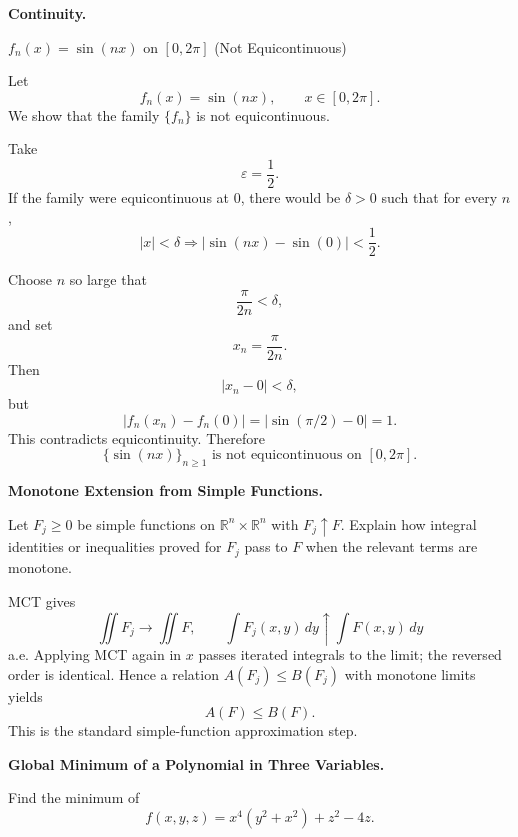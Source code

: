 \begin{problem}[CP-II-0224]
\label{prob:cp-ii-0224}
\textbf{Continuity.}

\hspace*{1.5em}$f_n(x)=\sin(nx)$ on $[0,2\pi]$ (Not Equicontinuous)
\end{problem}

\begin{solution}
Let
\[
f_n(x)=\sin(nx),
\qquad
x\in[0,2\pi].
\]
We show that the family \(\{f_n\}\) is not equicontinuous.

Take
\[
\varepsilon=\frac12.
\]
If the family were equicontinuous at \(0\), there would be \(\delta>0\) such that for every
\(n\),
\[
|x|<\delta
\Longrightarrow
|\sin(nx)-\sin(0)|<\frac12.
\]

Choose \(n\) so large that
\[
\frac{\pi}{2n}<\delta,
\]
and set
\[
x_n=\frac{\pi}{2n}.
\]
Then
\[
|x_n-0|<\delta,
\]
but
\[
|f_n(x_n)-f_n(0)|
=
|\sin(\pi/2)-0|
=
1.
\]
This contradicts equicontinuity. Therefore
\[
\boxed{
\{\sin(nx)\}_{n\ge1}
\text{ is not equicontinuous on }[0,2\pi].
}
\]
\end{solution}


\begin{problem}[CP-II-0226]
\label{prob:cp-ii-0226}
\textbf{Monotone Extension from Simple Functions.}

\hspace*{1.5em}Let \(F_j\ge0\) be simple functions on \(\mathbb R^n\times\mathbb R^n\) with \(F_j\uparrow F\). Explain how integral identities or inequalities proved for \(F_j\) pass to \(F\) when the relevant terms are monotone.
\end{problem}

\begin{solution}
MCT gives
\[
\iint F_j\to\iint F,\qquad \int F_j(x,y)\,dy\uparrow\int F(x,y)\,dy
\]
a.e. Applying MCT again in \(x\) passes iterated integrals to the limit; the reversed order is identical. Hence a relation \(A(F_j)\le B(F_j)\) with monotone limits yields
\[
\boxed{A(F)\le B(F).}
\]
This is the standard simple-function approximation step.
\end{solution}


\begin{problem}[CP-II-0227]
\label{prob:cp-ii-0227}
\textbf{Global Minimum of a Polynomial in Three Variables.}

\hspace*{1.5em}Find the minimum of
\[
f(x,y,z)=x^4(y^2+x^2)+z^2-4z.
\]
\end{problem}

